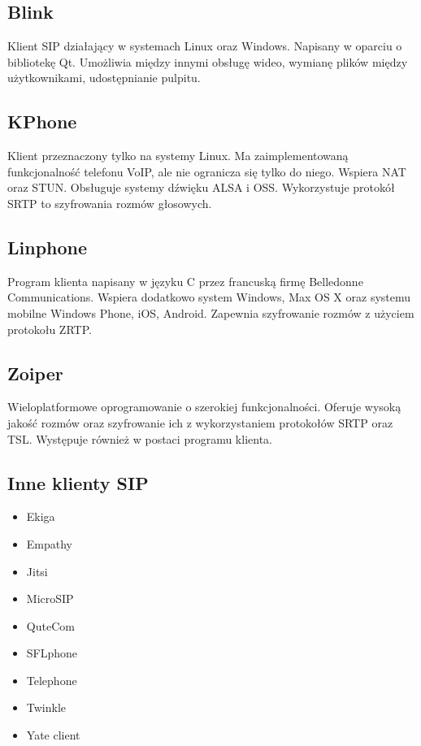 \subsection{Blink}
Klient SIP działający w systemach Linux oraz Windows. Napisany w oparciu o bibliotekę Qt. Umożliwia między innymi obsługę wideo, wymianę plików między użytkownikami, udostępnianie pulpitu.  

\subsection{KPhone}
Klient przeznaczony tylko na systemy Linux. Ma zaimplementowaną funkcjonalność telefonu VoIP, ale nie ogranicza się tylko do niego. Wspiera NAT oraz STUN. Obsługuje systemy dźwięku ALSA i OSS. Wykorzystuje protokół SRTP to szyfrowania rozmów głosowych.

\subsection{Linphone}

Program klienta napisany w języku C przez francuską firmę Belledonne Communications. Wspiera dodatkowo system Windows, Max OS X oraz systemu mobilne Windows Phone, iOS, Android. Zapewnia szyfrowanie rozmów z użyciem protokołu ZRTP.

\subsection{Zoiper}
Wieloplatformowe oprogramowanie o szerokiej funkcjonalności. Oferuje wysoką jakość rozmów oraz szyfrowanie ich z wykorzystaniem protokołów SRTP oraz TSL. Występuje również w postaci programu klienta. 

\subsection{Inne klienty SIP}
 
\begin{itemize}
	\item  Ekiga
	\item  Empathy
	\item  Jitsi
	\item  MicroSIP
	\item  QuteCom
	\item  SFLphone
	\item  Telephone
	\item  Twinkle
	\item  Yate client
\end{itemize}

